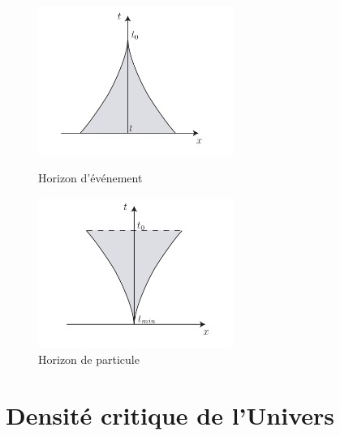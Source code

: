 \documentclass[a4paper,12pt]{report}
\theoremstyle{plain}
\theoremstyle{plain}
\begin{document}
\begin{figure}[h]
\begin{center}
	\begin{minipage}{14pc}
\includegraphics[width=15pc]{t6.png}
\caption{Horizon d'\'ev\'enement}
\end{minipage}\hspace{3pc}%
\begin{minipage}{14pc}
\includegraphics[width=15pc]{t8.png}
\caption{Horizon de particule}
\end{minipage}\hspace{3pc}%
\end{center}
\end{figure}

\section{Densit\'e critique de l'Univers} 
\end{document}
